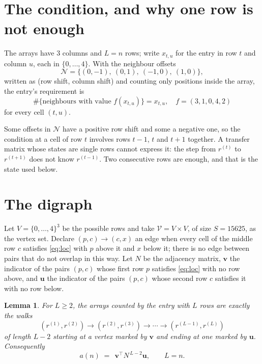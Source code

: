 \documentclass[11pt,a4paper]{article}
\theoremstyle{plain}
\newtheorem{lemma}[theorem]{Lemma}
\theoremstyle{definition}
\begin{document}
\section{The condition, and why one row is not enough}

The arrays have $3$ columns and $L=n$ rows; write $x_{t,u}$ for the entry in
row $t$ and column $u$, each in $\{0,\dots,4\}$. With the neighbour offsets
\[
\mathcal N=\{(0,-1),\ (0,1),\ (-1,0),\ (1,0)\},
\]
written as (row shift, column shift) and counting only positions inside the array, the
entry's requirement is
\begin{equation}\label{eq:loc}
\#\{\text{neighbours with value }f(x_{t,u})\}=x_{t,u},\quad f=(3,1,0,4,2)
\end{equation}
for every cell $(t,u)$.

Some offsets in $\mathcal N$ have a positive row shift and some a negative one, so the
condition at a cell of row $t$ involves rows $t-1$, $t$ and $t+1$ together. A transfer
matrix whose states are single rows cannot express it: the step from $r^{(t)}$ to
$r^{(t+1)}$ does not know $r^{(t-1)}$. Two consecutive rows are enough, and that is
the state used below.

\section{The digraph}

Let $V=\{0,\dots,4\}^{3}$ be the possible rows and take
$\mathcal V=V\times V$, of size $S=15625$, as the vertex set. Declare $(p,c)\to(c,x)$ an edge
when every cell of the middle row $c$ satisfies \eqref{eq:loc} with $p$ above it and $x$
below it; there is no edge between pairs that do not overlap in this way. Let $N$ be the
adjacency matrix, $\mathbf{v}$ the indicator of the pairs $(p,c)$ whose first row $p$
satisfies \eqref{eq:loc} with no row above, and $\mathbf{u}$ the indicator of
the pairs $(p,c)$ whose second row $c$ satisfies it with no row below.

\begin{lemma}\label{lem:walk}
For $L\ge2$, the arrays counted by the entry with $L$ rows are exactly the walks
\[
(r^{(1)},r^{(2)})\to(r^{(2)},r^{(3)})\to\cdots\to(r^{(L-1)},r^{(L)})
\]
of length $L-2$ starting at a vertex marked by $\mathbf{v}$ and ending at one marked by
$\mathbf{u}$. Consequently
\[
a(n)\;=\;\,\mathbf{v}^{\!\top}N^{\,L-2}\mathbf{u},\qquad L=n .
\]
\end{lemma}
\end{document}
